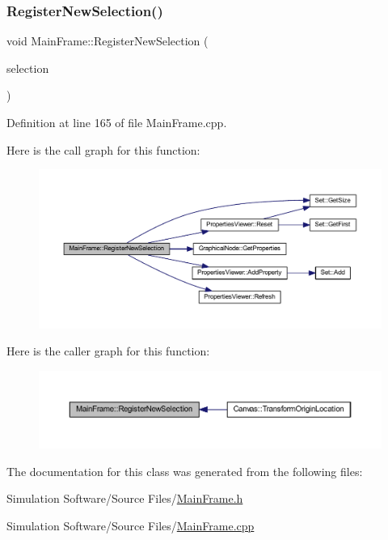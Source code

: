 \subsubsection{\texorpdfstring{Register\+New\+Selection()}{RegisterNewSelection()}}
{\footnotesize\ttfamily void Main\+Frame\+::\+Register\+New\+Selection (\begin{DoxyParamCaption}\item[{\hyperlink{class_graphical_node}{Graphical\+Node} $\ast$}]{selection }\end{DoxyParamCaption})}



Definition at line 165 of file Main\+Frame.\+cpp.

Here is the call graph for this function\+:
\nopagebreak
\begin{figure}[H]
\begin{center}
\leavevmode
\includegraphics[width=350pt]{class_main_frame_af5c0679e1a94303e8bd0a0742c25a59b_cgraph}
\end{center}
\end{figure}
Here is the caller graph for this function\+:
\nopagebreak
\begin{figure}[H]
\begin{center}
\leavevmode
\includegraphics[width=350pt]{class_main_frame_af5c0679e1a94303e8bd0a0742c25a59b_icgraph}
\end{center}
\end{figure}


The documentation for this class was generated from the following files\+:\begin{DoxyCompactItemize}
\item 
Simulation Software/\+Source Files/\hyperlink{_main_frame_8h}{Main\+Frame.\+h}\item 
Simulation Software/\+Source Files/\hyperlink{_main_frame_8cpp}{Main\+Frame.\+cpp}\end{DoxyCompactItemize}
